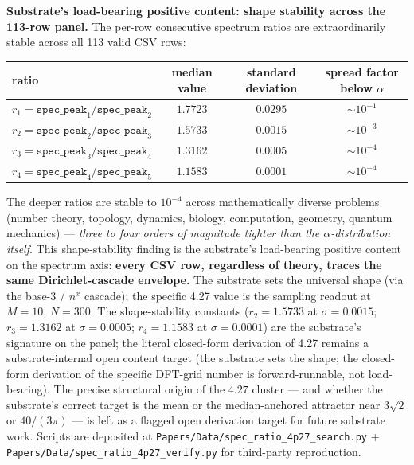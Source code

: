 \documentclass[11pt,a4paper]{amsart}
\theoremstyle{plain}
\theoremstyle{definition}
\begin{document}
\noindent\textbf{Substrate's load-bearing positive content: shape stability across the 113-row panel.} The per-row consecutive spectrum ratios are extraordinarily stable across all 113 valid CSV rows:
\begin{center}
\begin{tabular}{l|c|c|c}
\toprule
ratio & median value & standard deviation & spread factor below $\alpha$ \\
\midrule
$r_1 = \texttt{spec\_peak}_1/\texttt{spec\_peak}_2$ & $1.7723$ & $0.0295$ & $\sim 10^{-1}$ \\
$r_2 = \texttt{spec\_peak}_2/\texttt{spec\_peak}_3$ & $1.5733$ & $0.0015$ & $\sim 10^{-3}$ \\
$r_3 = \texttt{spec\_peak}_3/\texttt{spec\_peak}_4$ & $1.3162$ & $0.0005$ & $\sim 10^{-4}$ \\
$r_4 = \texttt{spec\_peak}_4/\texttt{spec\_peak}_5$ & $1.1583$ & $0.0001$ & $\sim 10^{-4}$ \\
\bottomrule
\end{tabular}
\end{center}
The deeper ratios are stable to $10^{-4}$ across mathematically diverse problems (number theory, topology, dynamics, biology, computation, geometry, quantum mechanics) --- \emph{three to four orders of magnitude tighter than the $\alpha$-distribution itself}. This shape-stability finding is the substrate's load-bearing positive content on the spectrum axis: \textbf{every CSV row, regardless of theory, traces the same Dirichlet-cascade envelope.} The substrate sets the universal shape (via the base-3 / $n^x$ cascade); the specific 4.27 value is the sampling readout at $M = 10$, $N = 300$. The shape-stability constants ($r_2 = 1.5733$ at $\sigma = 0.0015$; $r_3 = 1.3162$ at $\sigma = 0.0005$; $r_4 = 1.1583$ at $\sigma = 0.0001$) are the substrate's signature on the panel; the literal closed-form derivation of 4.27 remains a substrate-internal open content target (the substrate sets the shape; the closed-form derivation of the specific DFT-grid number is forward-runnable, not load-bearing). The precise structural origin of the $4.27$ cluster --- and whether the substrate's correct target is the mean or the median-anchored attractor near $3\sqrt{2}$ or $40/(3\pi)$ --- is left as a flagged open derivation target for future substrate work. Scripts are deposited at \texttt{Papers/Data/spec\_ratio\_4p27\_search.py} + \texttt{Papers/Data/spec\_ratio\_4p27\_verify.py} for third-party reproduction.
\end{document}
